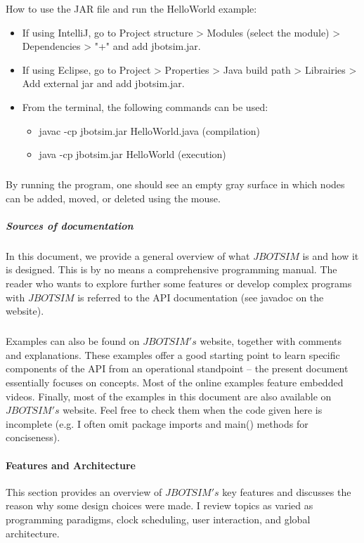 How to use the JAR file and run the HelloWorld example:
\begin{itemize}
	\item If using IntelliJ, go to Project structure > Modules (select the module) > Dependencies > "+" and add jbotsim.jar.
	\item If using Eclipse, go to Project > Properties > Java build path > Librairies > Add external jar and add jbotsim.jar.
	\item From the terminal, the following commands can be used:
		\begin{itemize}
			\item javac -cp jbotsim.jar HelloWorld.java (compilation)
			\item java -cp jbotsim.jar HelloWorld (execution)
		\end{itemize}
\end{itemize}

\subparagraph{}By running the program, one should see an empty gray surface in which nodes can be added, moved, or deleted using the mouse.
\subparagraph{Sources of documentation}In this document, we provide a general overview of what $JBOTSIM$ is and how it is designed. This is by no means a comprehensive programming manual. The reader who wants to explore further some features or develop complex programs with $JBOTSIM$ is referred to the API documentation (see javadoc on the website). \subparagraph{}Examples can also be found on $JBOTSIM's$ website, together with comments and explanations. These examples offer a good starting point to learn specific components of the API from an operational standpoint – the present document essentially focuses on concepts. Most of the online examples feature embedded videos. Finally, most of the examples in this document are also available on $JBOTSIM's$ website. Feel free to check them when the code given here is incomplete (e.g. I often omit package imports and main() methods for conciseness).
\paragraph{Features and Architecture}This section provides an overview of $JBOTSIM's$ key features and discusses the reason why some design choices were made. I review topics as varied as programming paradigms, clock scheduling, user interaction, and global architecture.

